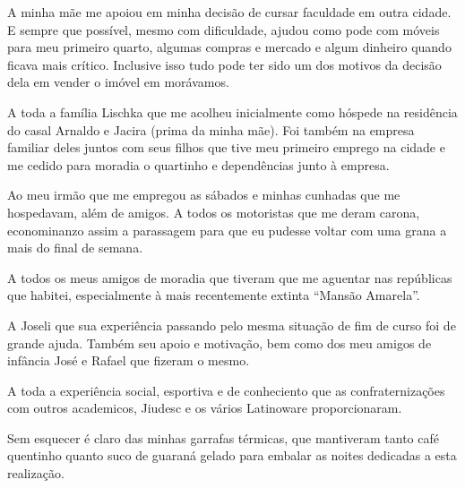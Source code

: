 
A minha mãe me apoiou em minha decisão de cursar faculdade em outra cidade. E
sempre que possível, mesmo com dificuldade, ajudou como pode com móveis para meu
primeiro quarto, algumas compras e mercado e algum dinheiro quando ficava mais
crítico. Inclusive isso tudo pode ter sido um dos motivos da decisão dela em
vender o imóvel em morávamos.

A toda a família Lischka que me acolheu inicialmente como hóspede na residência
do casal Arnaldo e Jacira (prima da minha mãe). Foi também na empresa familiar
deles juntos com seus filhos que tive meu primeiro emprego na cidade e me cedido
para moradia o quartinho e dependências junto à empresa.

Ao meu irmão que me empregou as sábados e minhas cunhadas que me hospedavam, além de amigos. A todos os motoristas que me deram carona, econominanzo assim a parassagem para que eu pudesse voltar com uma grana a mais do final de semana.

A todos os meus amigos de moradia que tiveram que me aguentar nas repúblicas que habitei, especialmente à mais recentemente extinta ``Mansão Amarela''.

A Joseli que sua experiência passando pelo mesma situação de fim de curso foi de grande ajuda. Também seu apoio e motivação, bem como dos meu amigos de infância José e Rafael que fizeram o mesmo.

A toda a experiência social, esportiva e de conheciento que as confraternizações com outros academicos, Jiudesc e os vários Latinoware proporcionaram.

Sem esquecer é claro das minhas garrafas térmicas, que mantiveram tanto café quentinho quanto suco de guaraná gelado para embalar as noites dedicadas a esta realização.
